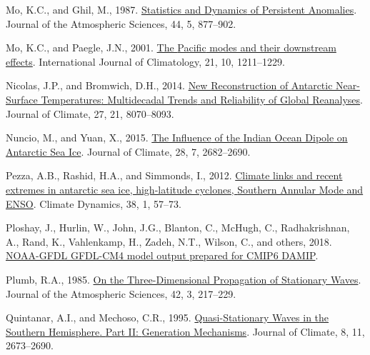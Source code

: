 \documentclass[12pt,oneside]{reedthesis}
\newlength{\cslhangindent}
\newenvironment{CSLReferences}[2] %
 {%
  \setlength{\parindent}{0pt}
  \ifodd #1 \everypar{\setlength{\hangindent}{\cslhangindent}}\ignorespaces\fi
  \ifnum #2 > 0
  \setlength{\parskip}{#2\baselineskip}
  \fi
 }%
 {}
\begin{document}
\begin{CSLReferences}{1}{0}
\leavevmode{}%
Mo, K.C., and Ghil, M., 1987. \href{https://doi.org/10.1175/1520-0469(1987)044\%3C0877:SADOPA\%3E2.0.CO;2}{Statistics and {Dynamics} of {Persistent Anomalies}}. Journal of the Atmospheric Sciences, 44, 5, 877--902.

\leavevmode{}%
Mo, K.C., and Paegle, J.N., 2001. \href{https://doi.org/10.1002/joc.685}{The {Pacific} modes and their downstream effects}. International Journal of Climatology, 21, 10, 1211--1229.

\leavevmode{}%
Nicolas, J.P., and Bromwich, D.H., 2014. \href{https://doi.org/10.1175/JCLI-D-13-00733.1}{New {Reconstruction} of {Antarctic Near-Surface Temperatures}: {Multidecadal Trends} and {Reliability} of {Global Reanalyses}}. Journal of Climate, 27, 21, 8070--8093.

\leavevmode{}%
Nuncio, M., and Yuan, X., 2015. \href{https://doi.org/10.1175/JCLI-D-14-00390.1}{The {Influence} of the {Indian Ocean Dipole} on {Antarctic Sea Ice}}. Journal of Climate, 28, 7, 2682--2690.

\leavevmode{}%
Pezza, A.B., Rashid, H.A., and Simmonds, I., 2012. \href{https://doi.org/10.1007/s00382-011-1044-y}{Climate links and recent extremes in antarctic sea ice, high-latitude cyclones, {Southern Annular Mode} and {ENSO}}. Climate Dynamics, 38, 1, 57--73.

\leavevmode{}%
Ploshay, J., Hurlin, W., John, J.G., Blanton, C., McHugh, C., Radhakrishnan, A., Rand, K., Vahlenkamp, H., Zadeh, N.T., Wilson, C., and others, 2018. \href{https://doi.org/10.22033/ESGF/CMIP6.11383}{NOAA-GFDL GFDL-CM4 model output prepared for CMIP6 DAMIP}.

\leavevmode{}%
Plumb, R.A., 1985. \href{https://doi.org/10.1175/1520-0469(1985)042\%3C0217:OTTDPO\%3E2.0.CO;2}{On the {Three-Dimensional Propagation} of {Stationary Waves}}. Journal of the Atmospheric Sciences, 42, 3, 217--229.

\leavevmode{}%
Quintanar, A.I., and Mechoso, C.R., 1995. \href{https://doi.org/10.1175/1520-0442(1995)008\%3C2673:QSWITS\%3E2.0.CO;2}{Quasi-{Stationary Waves} in the {Southern Hemisphere}. {Part II}: {Generation Mechanisms}}. Journal of Climate, 8, 11, 2673--2690.


\end{CSLReferences}
\end{document}
